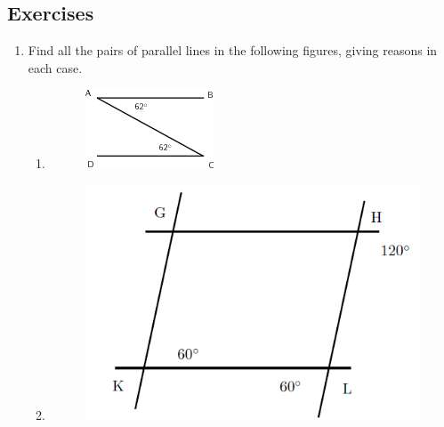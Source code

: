 \subsection{ Exercises}
\nopagebreak
\begin{enumerate}[noitemsep, label=\textbf{\arabic*}. ] 
\item Find all the pairs of parallel lines in the following figures, giving reasons in each case.
\begin{enumerate}[noitemsep, label=\textbf{\alph*}. ] 
\item 
\setcounter{subfigure}{0}
\begin{figure}[H] %
\begin{center}
\label{m39368*id320164!!!underscore!!!media}\label{m39368*id320164!!!underscore!!!printimage}\includegraphics{col11306.imgs/m39368_MG10C13_054.png} %
\vspace{2pt}
\vspace{.1in}
\end{center}
\end{figure}       
\item 
\setcounter{subfigure}{0}
\begin{figure}[H] %
\begin{center}
\label{m39368*id320183!!!underscore!!!media}\label{m39368*id320183!!!underscore!!!printimage}\includegraphics{col11306.imgs/m39368_MG10C13_055.png} %

\end{center}
\end{figure}
\end{enumerate}
\end{enumerate}
